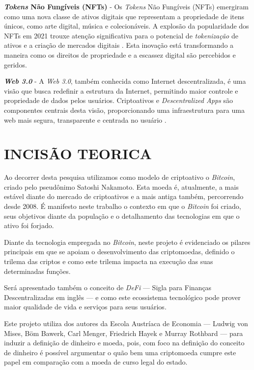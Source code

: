 \documentclass[article,12pt,oneside,a4paper,english,brazil]{unifil}
\begin{document}
\begin{Spacing}{1.5}
\textbf{\textit{Tokens} Não Fungíveis (NFTs)} - Os \textit{Tokens} Não Fungíveis (NFTs) emergiram como uma nova classe de ativos digitais que representam a propriedade de itens únicos, como arte digital, música e colecionáveis. A explosão da popularidade dos NFTs em 2021 trouxe atenção significativa para o potencial de \textit{tokenização} de ativos e a criação de mercados digitais \cite{wang2021non}. Esta inovação está transformando a maneira como os direitos de propriedade e a escassez digital são percebidos e geridos.

\textbf{\textit{Web 3.0}} - A \textit{Web 3.0}, também conhecida como Internet descentralizada, é uma visão que busca redefinir a estrutura da Internet, permitindo maior controle e propriedade de dados pelos usuários. Criptoativos e \textit{Descentralized Apps} são componentes centrais desta visão, proporcionando uma infraestrutura para uma web mais segura, transparente e centrada no usuário \cite{zhang2019secure}.

\section*{INCISÃO TEORICA}

Ao decorrer desta pesquisa utilizamos como modelo de criptoativo o \textit{Bitcoin}, criado pelo pseudônimo Satoshi Nakamoto. Esta moeda é, atualmente, a mais estável diante do mercado de criptoativos e a mais antiga também, percorrendo desde 2008. É manifesto neste trabalho o contexto em que o \textit{Bitcoin} foi criado, seus objetivos diante da população e o detalhamento das tecnologias em que o ativo foi forjado.

Diante da tecnologia empregada no \textit{Bitcoin}, neste projeto é evidenciado os pilares principais em que se apoiam o desenvolvimento das criptomoedas, definido o trilema das criptos e como este trilema impacta na execução das suas determinadas funções.

Será apresentado também o conceito de \textit{DeFi} — Sigla para Finanças Descentralizadas em inglês — e como este ecossistema tecnológico pode prover maior qualidade de vida e serviços para seus usuários.

Este projeto utiliza dos autores da Escola Austríaca de Economia — Ludwig von Mises, Böm Bawerk, Carl Menger, Friedrich Hayek e Murray Rothbard — para induzir a definição de dinheiro e moeda, pois, com foco na definição do conceito de dinheiro é possível argumentar o quão bem uma criptomoeda cumpre este papel em comparação com a moeda de curso legal do estado.


\end{Spacing}
\end{document}
